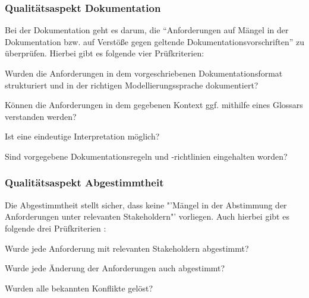 \documentclass [12pt, a4paper, oneside, titlepage, ngerman]{article}
\begin{document}
\subsubsection{Qualitätsaspekt Dokumentation}
Bei der Dokumentation geht es darum, die "`Anforderungen auf Mängel in der Dokumentation bzw. auf Verstöße gegen geltende Dokumentationsvorschriften"'\cite[S.99]{PohlRupp2015} zu überprüfen. Hierbei gibt es folgende vier Prüfkriterien\cite[vlg. S.99f.]{PohlRupp2015}:
\begin{description}[font=\itshape]\setlength\itemsep{0em}
\item[Konformität:] Wurden die Anforderungen in dem vorgeschriebenen Dokumentationsformat strukturiert und in der richtigen Modellierungssprache dokumentiert?
\item[Verständlichkeit:] Können die Anforderungen in dem gegebenen Kontext ggf. mithilfe eines Glossars verstanden werden?
\item[Eindeutigkeit:] Ist eine eindeutige Interpretation möglich?
\item[Konfirmität mit Dokumentationsregeln:] Sind vorgegebene Dokumentationsregeln und -richtlinien eingehalten worden?
\end{description}

\subsubsection{Qualitätsaspekt Abgestimmtheit}
Die Abgestimmtheit stellt sicher, dass keine "'Mängel in der Abstimmung der Anforderungen unter relevanten Stakeholdern"'\cite[S.100]{PohlRupp2015} vorliegen. Auch hierbei gibt es folgende drei Prüfkriterien\cite[vgl. S.100]{PohlRupp2015} :
\begin{description}[font=\itshape]\setlength\itemsep{0em}
\item[Abstimmung:] Wurde jede Anforderung mit relevanten Stakeholdern abgestimmt?
\item[Abstimmung nach Änderungen:] Wurde jede Änderung der Anforderungen auch abgestimmt?
\item[Konflikte:] Wurden alle bekannten Konflikte gelöst?
\end{description}
\end{document}
